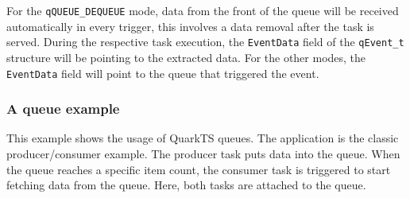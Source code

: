 \begin{tcolorbox}
\HandRight For the \lstinline{qQUEUE_DEQUEUE} mode,  data from the front of the queue will be received automatically in every trigger, this involves a data removal after the task is served. During the respective task execution, the \lstinline{EventData} field of the \lstinline{qEvent_t} structure will be pointing to the extracted data. For the other modes, the \lstinline{EventData} field will point to the queue that triggered the event.
\end{tcolorbox}
    
\subsubsection{A queue example}
This example shows the usage of QuarkTS queues. The application is the classic producer/consumer example. The producer task puts data into the queue. When the queue reaches a specific item count, the consumer task is triggered to start fetching data from the queue. Here, both tasks are attached to the queue. 
\medskip


